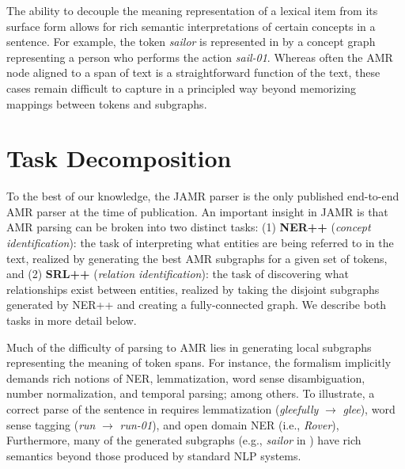 \documentclass[11pt]{article}
\newcommand\w[1]{\textit{#1}} %
\newcommand\n[1]{\textit{#1}} %
\begin{document}
The ability to decouple the meaning representation of a lexical item from its
  surface form allows for rich semantic interpretations of certain concepts
  in a sentence.
For example, the token \w{sailor} is represented in  by a concept graph 
  representing a person who performs the action \n{sail-01}. 
Whereas often the AMR node aligned to a span of text is a straightforward function
  of the text, these cases remain difficult to capture in a principled way beyond
  memorizing mappings between tokens and subgraphs.


\section{Task Decomposition}



To the best of our knowledge, the JAMR parser is
the only published end-to-end AMR parser at the time of publication.
An important insight in JAMR is that AMR parsing can be broken into two 
 distinct tasks: (1) \textbf{NER++} (\textit{concept identification}): the task of interpreting what entities are being referred to in 
the text, realized by generating the best AMR subgraphs for a given set of tokens, and
(2) \textbf{SRL++} (\textit{relation identification}): the task of discovering what 
relationships exist between entities, realized by taking the disjoint subgraphs generated
  by NER++ and creating a fully-connected graph.
We describe both tasks in more detail below.


Much of the difficulty of parsing to AMR lies in generating local subgraphs representing the meaning of token spans.
For instance, the formalism implicitly demands rich notions of NER, lemmatization, word sense disambiguation, number normalization, and temporal parsing; among others.
To illustrate, a correct parse of the sentence in  requires lemmatization (\textit{gleefully} $\rightarrow$ \textit{glee}), word sense tagging (\textit{run} $\rightarrow$ \textit{run-01}), 
and open domain NER (i.e., \textit{Rover}),
Furthermore, many of the generated subgraphs (e.g., \textit{sailor} in ) have rich semantics beyond those produced by standard NLP systems.
\end{document}

